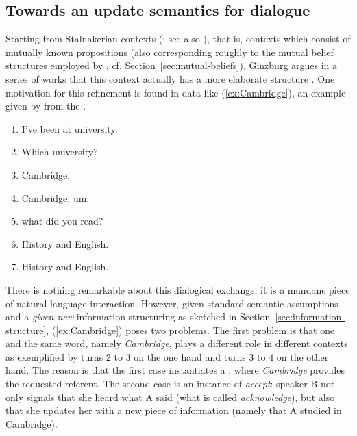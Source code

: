 \documentclass[output=paper]{langsci/langscibook}
\begin{document}
\subsection{Towards an update semantics for dialogue}
\label{sec:dialogue-game-boards}

Starting from Stalnakerian contexts  (\citealp{Stalnaker:1978}; see also \citealp{Lewis:1979:b}), that is, contexts which consist of mutually known propositions (also corresponding roughly to the mutual belief structures employed by \citealp{Green:1996}, cf. Section~\ref{sec:mutual-beliefs}), Ginzburg argues in a series of works that this context actually has a more elaborate structure \citep{Ginzburg:1994,Ginzburg:1996,Ginzburg:1997}.
%
One motivation for this refinement is found in data like (\ref{ex:Cambridge}), an
example given by \citet[p.~2]{Ginzburg:1994} from the  \citep{Svartvik:1990}.
%
\ea \label{ex:Cambridge}
\begin{enumerate}[noitemsep]
\item {} I've been at university.
\item {} Which university?
\item {} Cambridge.
\item {} Cambridge, um.
\item \speaking{} what did you read?
\item {} History and English.
\item {} History and English.
\end{enumerate}
\z

There is nothing remarkable about this dialogical exchange, it is a mundane  piece of natural language interaction.
%
However, given standard semantic assumptions and  a \emph{given-new} information   structuring as sketched in Section~\ref{sec:information-structure},  (\ref{ex:Cambridge}) poses two problems.
%
The first problem is that one and the same word, namely \textit{Cambridge}, plays a different role in different contexts as exemplified by turns 2 to 3 on the one hand and turns 3 to 4 on the other hand.
%
The reason is that the first case instantiates a , where \textit{Cambridge} provides the requested referent.
%
The second case is an instance of \emph{accept}:  speaker B not only signals that she heard what A said (what is called \emph{acknowledge}),  but also that she updates  her  with a new piece of information (namely that A studied in Cambridge).
\end{document}
